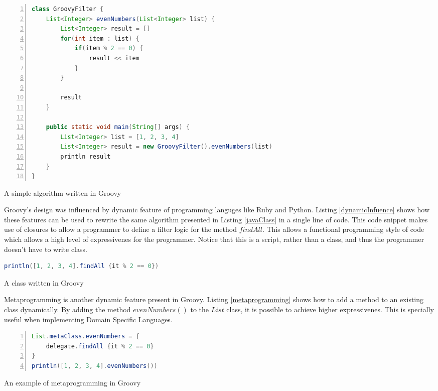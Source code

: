 \documentclass[preprint]{sigplanconf}
\begin{document}
\begin{Listing}[ht]
\begin{lstlisting}[language=Java,tabsize=2,breaklines=true,numbers=left]
class GroovyFilter {
	List<Integer> evenNumbers(List<Integer> list) {
		List<Integer> result = []
		for(int item : list) {
			if(item % 2 == 0) {
				result << item
			}
		}

		result
	}

	public static void main(String[] args) {
		List<Integer> list = [1, 2, 3, 4]
		List<Integer> result = new GroovyFilter().evenNumbers(list)
		println result
	}
}
\end{lstlisting}
\caption{A simple algorithm written in Groovy}
\label{groovyClass}
\end{Listing}

Groovy's design was influenced by dynamic feature of programming languges like Ruby and Python.
Listing \ref{dynamicInfuence} shows how these features can be used to rewrite the same algorithm presented in Listing \ref{javaClass} in a single line of code. 
This code snippet makes use of closures to allow a programmer to define a filter logic for the method $findAll$.
This allows a functional programming style of code which allows a high level of expressivenes for the programmer.
Notice that this is a script, rather than a class, and thus the programmer doesn't have to write class.

\begin{Listing}[ht]
\begin{lstlisting}[language=Java,tabsize=2,breaklines=true]
println([1, 2, 3, 4].findAll {it % 2 == 0})
\end{lstlisting}
\caption{A class written in Groovy}
\label{dynamicInfuence}
\end{Listing}

Metaprogramming is another dynamic feature present in Groovy. 
Listing \ref{metaprogramming} shows how to add a method to an existing class dynamically.
By adding the method $evenNumbers()$ to the $List$ class, it is possible to achieve higher expressivenes.
This is specially useful when implementing Domain Specific Languages.

\begin{Listing}[ht]
\begin{lstlisting}[language=Java,tabsize=2,breaklines=true,numbers=left]
List.metaClass.evenNumbers = {
	delegate.findAll {it % 2 == 0}
}
println([1, 2, 3, 4].evenNumbers())

\end{lstlisting}
\caption{An example of metaprogramming in Groovy}
\label{metaprogramming}
\end{Listing}
\end{document}

